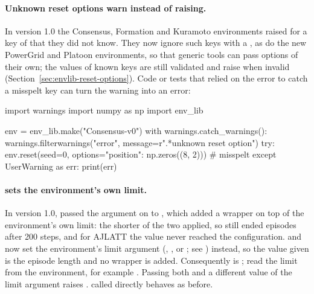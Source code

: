 \paragraph{Unknown reset options warn instead of raising.} In version 1.0 the
Consensus, Formation and Kuramoto environments raised  for a
key of  that they did not know. They now ignore such
keys with a , as do the new PowerGrid and Platoon
environments, so that generic tools can pass options of their own; the values
of known keys are still validated and raise  when invalid
(Section~\ref{sec:envlib-reset-options}). Code or tests that relied on the
error to catch a misspelt key can turn the warning into an error:

\begin{pycode}
import warnings
import numpy as np
import env_lib

env = env_lib.make("Consensus-v0")
with warnings.catch_warnings():
    warnings.filterwarnings("error", message=r".*unknown reset option")
    try:
        env.reset(seed=0, options={"position": np.zeros((8, 2))})   # misspelt
    except UserWarning as err:
        print(err)
\end{pycode}

\paragraph{\texorpdfstring{}{max\_episode\_steps} sets the environment's own limit.}
In version 1.0,  passed the
argument on to , which added a  wrapper on
top of the environment's own limit: the shorter of the two applied, so
 still ended
episodes after 200 steps, and for AJLATT the value never reached the
configuration.  and  now set the
environment's limit argument (, ,
 or ; see
) instead, so the value given is the
episode length and no  wrapper is added. Consequently
 is ; read the limit from the
environment, for example . Passing both
 and a different value of the limit argument raises
.  called directly behaves as before.

